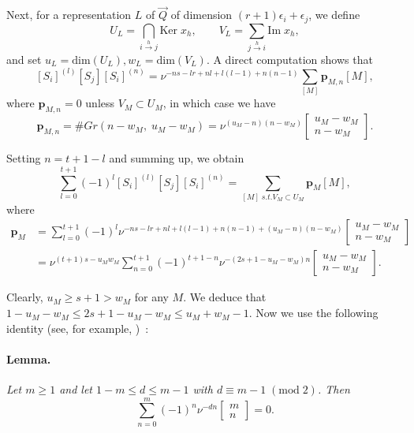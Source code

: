 \documentclass[a4paper,10pt]{amsart}
\def\n{\mathfrak{n}}
\def\v{\nu}
\numberwithin{equation}{section}
\begin{document}
Next, for a
representation $L$ of $\vec{Q}$ of dimension $(r+1)\epsilon_i +
\epsilon_j$, we define
$$U_L=\bigcap_{i \stackrel{h}{\to} j} \mathrm{Ker}\;x_{h},
\qquad  V_L=\sum_{j \stackrel{h}{\to} i} \mathrm{Im}\;x_{h},$$
and set $u_L=\mathrm{dim}(U_L), w_L=\mathrm{dim}(V_L)$.
A direct
computation shows that
$$[S_i]^{(l)}
[S_{j}][S_i]^{(n)}=\v^{-ns-lr+nl+l(l-1)+n(n-1)}\sum_{[M]}
\mathbf{p}_{M,n}[M],$$
where $\mathbf{p}_{M,n}=0$ unless $V_M \subset U_M$, in which case we have
$$\mathbf{p}_{M,n}=\#Gr(n-w_M,\;u_M-w_M)=\v^{(u_M-n)(n-w_M)}
\begin{bmatrix} u_M-w_M\\ n-w_M\end{bmatrix}.$$

\vspace{.1in}

Setting $n=t+1-l$ and summing up, we obtain
$$\sum_{l=0}^{t+1} (-1)^l [S_i]^{(l)}[S_{j}][S_i]^{(n)}=
\sum_{[M]\;s.t.V_M \subset U_M} \mathbf{p}_M[M],$$
where
\begin{equation*}
\begin{split}
\mathbf{p}_M &=\sum_{l=0}^{t+1} (-1)^l
\v^{-ns-lr+nl+l(l-1)+n(n-1)+(u_M-n)(n-w_M)}
\begin{bmatrix} u_M-w_M\\ n-w_M\end{bmatrix}\\
&=\v^{(t+1)s -u_Mw_M}
\sum_{n=0}^{t+1}(-1)^{t+1-n}\v^{-(2s+1-u_M-w_M)n} \begin{bmatrix}
u_M-w_M\\ n-w_M\end{bmatrix}.
\end{split}
\end{equation*}

\vspace{.1in}

Clearly, $u_M \geq s+1 >w_M$ for any $M$. We deduce that
$1-u_M-w_M \leq 2s+1-u_M-w_M \leq u_M +w_M -1$.  Now we use the following identity
(see, for example, \cite[(3.2.8)]{Kas})~:

\vspace{.05in}

\paragraph{\textbf{Lemma.}} \textit{Let $m \geq 1$ and let $1-m \leq d \leq m-1$ with $d \equiv
m-1  \;(\mathrm{mod}\;2)$. Then}
$$\sum_{n=0}^m (-1)^n \v^{-dn}
\left[\begin{matrix} m\\n\end{matrix}\right]=0.$$
\end{document}
